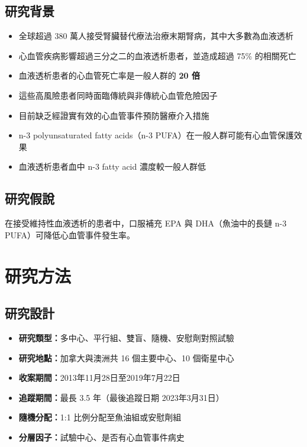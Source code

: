 \documentclass[12pt,a4paper]{article}
\begin{document}
\subsection{研究背景}

\begin{itemize}
    \item 全球超過 380 萬人接受腎臟替代療法治療末期腎病，其中大多數為血液透析
    \item 心血管疾病影響超過三分之二的血液透析患者，並造成超過 75\% 的相關死亡
    \item 血液透析患者的心血管死亡率是一般人群的 \textbf{20 倍}
    \item 這些高風險患者同時面臨傳統與非傳統心血管危險因子
    \item 目前缺乏經證實有效的心血管事件預防醫療介入措施
    \item n-3 polyunsaturated fatty acids（n-3 PUFA）在一般人群可能有心血管保護效果
    \item 血液透析患者血中 n-3 fatty acid 濃度較一般人群低
\end{itemize}

\subsection{研究假說}

在接受維持性血液透析的患者中，口服補充 EPA 與 DHA（魚油中的長鏈 n-3 PUFA）可降低心血管事件發生率。

\section{研究方法}

\subsection{研究設計}

\begin{itemize}
    \item \textbf{研究類型：}多中心、平行組、雙盲、隨機、安慰劑對照試驗
    \item \textbf{研究地點：}加拿大與澳洲共 16 個主要中心、10 個衛星中心
    \item \textbf{收案期間：}2013年11月28日至2019年7月22日
    \item \textbf{追蹤期間：}最長 3.5 年（最後追蹤日期 2023年3月31日）
    \item \textbf{隨機分配：}1:1 比例分配至魚油組或安慰劑組
    \item \textbf{分層因子：}試驗中心、是否有心血管事件病史
\end{itemize}
\end{document}

